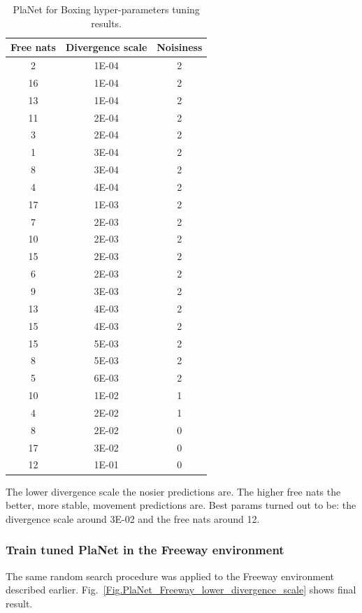 \begin{table}[H]
\centering
\begin{tabular}{| c | c | c |} 
\hline
Free nats & Divergence scale & Noisiness \\
\hline
2  & 1E-04 & 2 \\
16 & 1E-04 & 2 \\
13 & 1E-04 & 2 \\
11 & 2E-04 & 2 \\
3  & 2E-04 & 2 \\
1  & 3E-04 & 2 \\
8  & 3E-04 & 2 \\
4  & 4E-04 & 2 \\
17 & 1E-03 & 2 \\
7  & 2E-03 & 2 \\
10 & 2E-03 & 2 \\
15 & 2E-03 & 2 \\
6  & 2E-03 & 2 \\
9  & 3E-03 & 2 \\
13 & 4E-03 & 2 \\
15 & 4E-03 & 2 \\
15 & 5E-03 & 2 \\
8  & 5E-03 & 2 \\
5  & 6E-03 & 2 \\
10 & 1E-02 & 1 \\
4  & 2E-02 & 1 \\
8  & 2E-02 & 0 \\
17 & 3E-02 & 0 \\
12 & 1E-01 & 0 \\
\hline
\end{tabular}
\caption{PlaNet for Boxing hyper-parameters tuning results.}
\label{Table.PlaNet_Boxing_tuning}
\end{table}

The lower divergence scale the nosier predictions are. The higher free nats the better, more stable, movement predictions are. Best params turned out to be: the divergence scale around 3E-02 and the free nats around 12.

\subsubsection{Train tuned PlaNet in the Freeway environment}

The same random search procedure was applied to the Freeway environment described earlier. Fig.~\ref{Fig.PlaNet_Freeway_lower_divergence_scale} shows final result.


